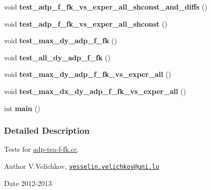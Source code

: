 \begin{DoxyCompactItemize}
\item 
\hypertarget{adp-tea-f-fk-tests_8cc_aeada589e96a9fee2c1afd90293ffa355}{void {\bfseries test\-\_\-adp\-\_\-f\-\_\-fk\-\_\-vs\-\_\-exper\-\_\-all\-\_\-shconst\-\_\-and\-\_\-diffs} ()}\label{adp-tea-f-fk-tests_8cc_aeada589e96a9fee2c1afd90293ffa355}

\item 
\hypertarget{adp-tea-f-fk-tests_8cc_a7722e172849fd429be1c73f67913ed2a}{void {\bfseries test\-\_\-adp\-\_\-f\-\_\-fk\-\_\-vs\-\_\-exper\-\_\-all\-\_\-shconst} ()}\label{adp-tea-f-fk-tests_8cc_a7722e172849fd429be1c73f67913ed2a}

\item 
\hypertarget{adp-tea-f-fk-tests_8cc_a03c3bb3b105a1830085105c5ab773f43}{void {\bfseries test\-\_\-max\-\_\-dy\-\_\-adp\-\_\-f\-\_\-fk} ()}\label{adp-tea-f-fk-tests_8cc_a03c3bb3b105a1830085105c5ab773f43}

\item 
\hypertarget{adp-tea-f-fk-tests_8cc_a6678efd4c2e1e3c025ffb150a937fab8}{void {\bfseries test\-\_\-all\-\_\-dy\-\_\-adp\-\_\-f\-\_\-fk} ()}\label{adp-tea-f-fk-tests_8cc_a6678efd4c2e1e3c025ffb150a937fab8}

\item 
\hypertarget{adp-tea-f-fk-tests_8cc_a3cefb5f19f27b930924b02f0d0dc456f}{void {\bfseries test\-\_\-max\-\_\-dy\-\_\-adp\-\_\-f\-\_\-fk\-\_\-vs\-\_\-exper\-\_\-all} ()}\label{adp-tea-f-fk-tests_8cc_a3cefb5f19f27b930924b02f0d0dc456f}

\item 
\hypertarget{adp-tea-f-fk-tests_8cc_a920f1a7c8bc84d67c7e0f71def63e971}{void {\bfseries test\-\_\-max\-\_\-dx\-\_\-dy\-\_\-adp\-\_\-f\-\_\-fk\-\_\-vs\-\_\-exper\-\_\-all} ()}\label{adp-tea-f-fk-tests_8cc_a920f1a7c8bc84d67c7e0f71def63e971}

\item 
\hypertarget{adp-tea-f-fk-tests_8cc_ae66f6b31b5ad750f1fe042a706a4e3d4}{int {\bfseries main} ()}\label{adp-tea-f-fk-tests_8cc_ae66f6b31b5ad750f1fe042a706a4e3d4}

\end{DoxyCompactItemize}


\subsubsection{\-Detailed \-Description}
\-Tests for \hyperlink{adp-tea-f-fk_8cc}{adp-\/tea-\/f-\/fk.\-cc}. \begin{DoxyAuthor}{\-Author}
\-V.\-Velichkov, \href{mailto:vesselin.velichkov@uni.lu}{\tt vesselin.\-velichkov@uni.\-lu} 
\end{DoxyAuthor}
\begin{DoxyDate}{\-Date}
2012-\/2013 
\end{DoxyDate}

